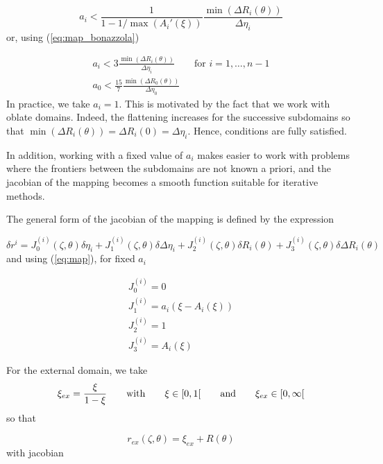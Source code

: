 \begin{equation}
a_i<\frac{1}{1-1/\max(A_i'(\xi))}\frac{\min(\Delta R_i(\theta))}{\Delta\eta_i}
\end{equation}
or, using (\ref{eq:map_bonazzola})

\begin{equation}
\begin{array}{l}
\displaystyle a_i<3\frac{\min(\Delta R_i(\theta))}{\Delta\eta_i} \qquad \mbox{for $i=1,\ldots,n-1$}\\
\displaystyle a_0<\frac{15}{7}\frac{\min(\Delta R_0(\theta))}{\Delta\eta_0}
\end{array}
\label{cdtstab}
\end{equation}
In practice, we take $a_i=1$. This is motivated by the fact that
we work with oblate domains. Indeed, the flattening increases for
the successive subdomains so that $\min(\Delta R_i(\theta))=\Delta
R_i(0)=\Delta\eta_i$. Hence, conditions  are fully satisfied.

In addition, working with a fixed value of $a_i$ makes easier to work
with problems where the frontiers between the subdomains are not known
a priori, and the jacobian of the mapping becomes a smooth function
suitable for iterative methods.

The general form of the jacobian of the mapping is defined by the expression

\begin{equation}
\delta r^{i}=J_0^{(i)}(\zeta,\theta)\delta\eta_i+J_1^{(i)}(\zeta,\theta)\delta\Delta\eta_i
+J_2^{(i)}(\zeta,\theta)\delta R_i(\theta)+J_3^{(i)}(\zeta,\theta)\delta\Delta R_i(\theta)
\end{equation}
and using (\ref{eq:map}), for fixed $a_i$

\begin{equation}
\begin{array}{l}
J_0^{(i)}=0\\
J_1^{(i)}=a_i(\xi-A_i(\xi))\\
J_2^{(i)}=1\\
J_3^{(i)}=A_i(\xi)
\end{array}
\end{equation}

For the external domain, we take 
\begin{equation}
\xi_{ex}=\frac{\xi}{1-\xi} {\qquad {\rm with}\qquad} \xi\in[0,1[ \qquad {\rm and}\qquad \xi_{ex}\in[0,\infty[
\end{equation}
so that

\begin{equation}
r_{ex}(\zeta,\theta)=\xi_{ex}+R(\theta)
\end{equation}
with jacobian

